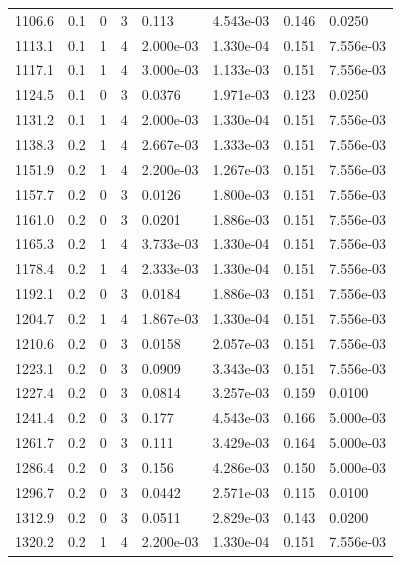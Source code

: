 \documentclass[preview]{standalone}
\begin{document}
{{{{{\begin{tabular}{L{1.2cm}C{1.2cm} C{0.3cm}C{0.5cm} C{1.4cm}C{1.4cm} C{1.4cm}C{1.4cm}}
  1106.6  &   0.1  & 0     &  3 &  0.113  & 4.543e-03  & 0.146 &  0.0250   \\ 
  1113.1  &   0.1  & 1     &  4 &  2.000e-03  & 1.330e-04  & 0.151 &  7.556e-03   \\ 
  1117.1  &   0.1  & 1     &  4 &  3.000e-03  & 1.133e-03  & 0.151 &  7.556e-03   \\ 
  1124.5  &   0.1  & 0     &  3 &  0.0376  & 1.971e-03  & 0.123 &  0.0250   \\ 
  1131.2  &   0.1  & 1     &  4 &  2.000e-03  & 1.330e-04  & 0.151 &  7.556e-03   \\ 
  1138.3  &   0.2  & 1     &  4 &  2.667e-03  & 1.333e-03  & 0.151 &  7.556e-03   \\ 
  1151.9  &   0.2  & 1     &  4 &  2.200e-03  & 1.267e-03  & 0.151 &  7.556e-03   \\ 
  1157.7  &   0.2  & 0     &  3 &  0.0126  & 1.800e-03  & 0.151 &  7.556e-03   \\ 
  1161.0  &   0.2  & 0     &  3 &  0.0201  & 1.886e-03  & 0.151 &  7.556e-03   \\ 
  1165.3  &   0.2  & 1     &  4 &  3.733e-03  & 1.330e-04  & 0.151 &  7.556e-03   \\ 
  1178.4  &   0.2  & 1     &  4 &  2.333e-03  & 1.330e-04  & 0.151 &  7.556e-03   \\ 
  1192.1  &   0.2  & 0     &  3 &  0.0184  & 1.886e-03  & 0.151 &  7.556e-03   \\ 
  1204.7  &   0.2  & 1     &  4 &  1.867e-03  & 1.330e-04  & 0.151 &  7.556e-03   \\ 
  1210.6  &   0.2  & 0     &  3 &  0.0158  & 2.057e-03  & 0.151 &  7.556e-03   \\ 
  1223.1  &   0.2  & 0     &  3 &  0.0909  & 3.343e-03  & 0.151 &  7.556e-03   \\ 
  1227.4  &   0.2  & 0     &  3 &  0.0814  & 3.257e-03  & 0.159 &  0.0100   \\ 
  1241.4  &   0.2  & 0     &  3 &  0.177  & 4.543e-03  & 0.166 &  5.000e-03   \\ 
  1261.7  &   0.2  & 0     &  3 &  0.111  & 3.429e-03  & 0.164 &  5.000e-03   \\ 
  1286.4  &   0.2  & 0     &  3 &  0.156  & 4.286e-03  & 0.150 &  5.000e-03   \\ 
  1296.7  &   0.2  & 0     &  3 &  0.0442  & 2.571e-03  & 0.115 &  0.0100   \\ 
  1312.9  &   0.2  & 0     &  3 &  0.0511  & 2.829e-03  & 0.143 &  0.0200   \\ 
  1320.2  &   0.2  & 1     &  4 &  2.200e-03  & 1.330e-04  & 0.151 &  7.556e-03   \\ 

\end{tabular}}}}}}
\end{document}
